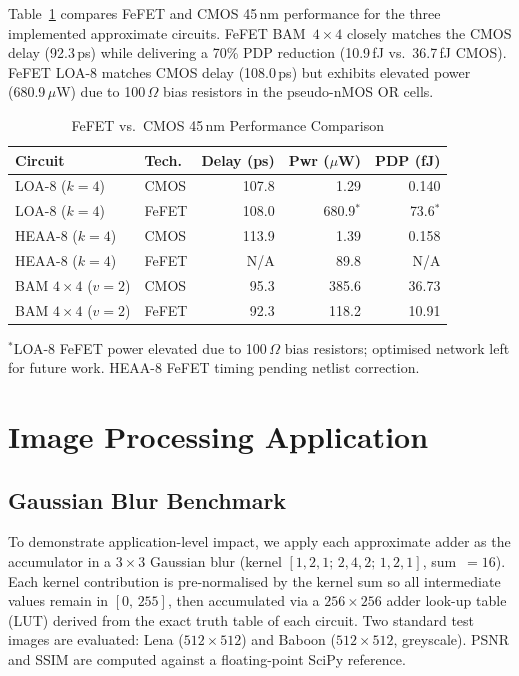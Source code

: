 \documentclass[letterpaper, 10 pt, conference]{ieeeconf}  %
\begin{document}
Table~\ref{tab:fefet} compares FeFET and CMOS 45\,nm performance for the three
implemented approximate circuits. FeFET BAM~$4\times4$ closely matches the
CMOS delay (92.3\,ps) while delivering a 70\% PDP reduction (10.9\,fJ
vs.\ 36.7\,fJ CMOS). FeFET LOA-8 matches CMOS delay (108.0\,ps) but exhibits
elevated power (680.9\,$\mu$W) due to 100\,$\Omega$ bias resistors in the
pseudo-nMOS OR cells.

\begin{table}[t]
  \caption{FeFET vs.\ CMOS 45\,nm Performance Comparison}
  \label{tab:fefet}
  \begin{center}
    \small
    \begin{tabular}{llrrr}
      \toprule
      \textbf{Circuit} & \textbf{Tech.} & \textbf{Delay (ps)} & \textbf{Pwr ($\mu$W)} & \textbf{PDP (fJ)} \\
      \midrule
      LOA-8 ($k{=}4$)           & CMOS  & 107.8 &   1.29 &  0.140 \\
      LOA-8 ($k{=}4$)           & FeFET & 108.0 & 680.9$^{*}$ & 73.6$^{*}$ \\
      HEAA-8 ($k{=}4$)          & CMOS  & 113.9 &   1.39 &  0.158 \\
      HEAA-8 ($k{=}4$)          & FeFET &  N/A  &  89.8  &  N/A   \\
      BAM $4{\times}4$ ($v{=}2$) & CMOS  &  95.3 & 385.6  & 36.73  \\
      BAM $4{\times}4$ ($v{=}2$) & FeFET &  92.3 & 118.2  & 10.91  \\
      \bottomrule
    \end{tabular}
  \end{center}
  \vspace{1pt}
  {\footnotesize $^{*}$LOA-8 FeFET power elevated due to 100\,$\Omega$ bias resistors; optimised
  network left for future work. HEAA-8 FeFET timing pending netlist correction.}
\end{table}


\section{Image Processing Application}

\subsection{Gaussian Blur Benchmark}

To demonstrate application-level impact, we apply each approximate adder as
the accumulator in a $3\times3$ Gaussian blur (kernel
$[1,2,1;\,2,4,2;\,1,2,1]$, sum~$= 16$). Each kernel contribution is
pre-normalised by the kernel sum so all intermediate values remain in
$[0,\,255]$, then accumulated via a $256\times256$ adder look-up table (LUT)
derived from the exact truth table of each circuit. Two standard test images
are evaluated: Lena ($512\times512$) and Baboon ($512\times512$, greyscale).
PSNR and SSIM are computed against a floating-point SciPy reference.
\end{document}
